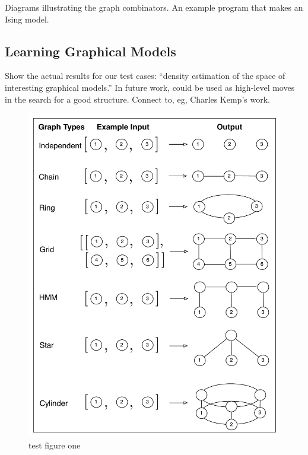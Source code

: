 \documentclass{article} %
\begin{document}
Diagrams illustrating the graph combinators. An example program that makes an Ising model.

\subsection{Learning Graphical Models}

Show the actual results for our test cases: ``density estimation of the space of interesting graphical models.''
In future work, could be used as high-level moves in the search for a good structure.
Connect to, eg, Charles Kemp's work.

\begin{figure}
\begin{minipage}[c][8cm][t]{.4\textwidth}
  \vspace*{\fill}
  \includegraphics[width=\linewidth]{./figures/tasks.pdf}
  \caption{test figure one}
  \label{fig:test1}
\end{minipage}%
\begin{minipage}[c][8cm][t]{.3\textwidth}

\end{minipage}
\end{figure}
\end{document}
